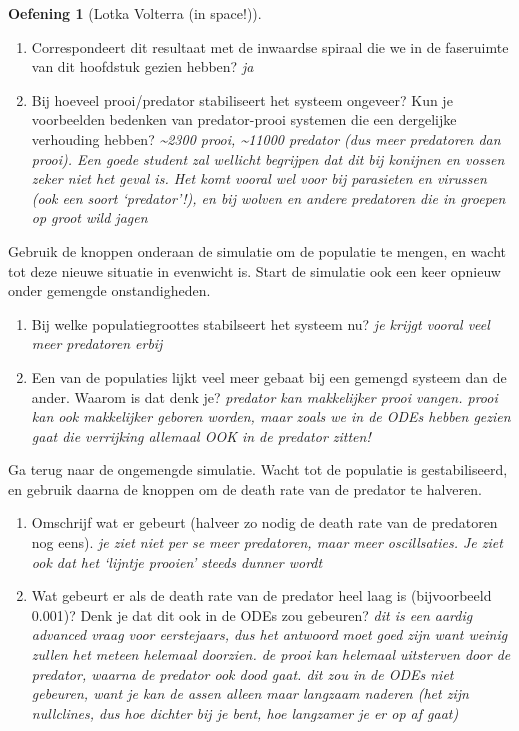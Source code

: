 \documentclass[
  a4paper,
]{scrbook}
\theoremstyle{definition}
\newtheorem{exercise}{Oefening}[chapter]
\theoremstyle{remark}
\begin{document}
\begin{exercise}[Lotka Volterra (in
space!)]
\begin{enumerate}
\def\labelenumi{\alph{enumi}.}
\setcounter{enumi}{1}
\item
  Correspondeert dit resultaat met de inwaardse spiraal die we in de
  faseruimte van dit hoofdstuk gezien hebben? \emph{ja}
\item
  Bij hoeveel prooi/predator stabiliseert het systeem ongeveer? Kun je
  voorbeelden bedenken van predator-prooi systemen die een dergelijke
  verhouding hebben? \emph{\textasciitilde2300 prooi,
  \textasciitilde11000 predator (dus meer predatoren dan prooi). Een
  goede student zal wellicht begrijpen dat dit bij konijnen en vossen
  zeker niet het geval is. Het komt vooral wel voor bij parasieten en
  virussen (ook een soort `predator'!), en bij wolven en andere
  predatoren die in groepen op groot wild jagen}
\end{enumerate}

Gebruik de knoppen onderaan de simulatie om de populatie te mengen, en
wacht tot deze nieuwe situatie in evenwicht is. Start de simulatie ook
een keer opnieuw onder gemengde onstandigheden.

\begin{enumerate}
\def\labelenumi{\alph{enumi}.}
\setcounter{enumi}{3}
\item
  Bij welke populatiegroottes stabilseert het systeem nu? \emph{je
  krijgt vooral veel meer predatoren erbij}
\item
  Een van de populaties lijkt veel meer gebaat bij een gemengd systeem
  dan de ander. Waarom is dat denk je? \emph{predator kan makkelijker
  prooi vangen. prooi kan ook makkelijker geboren worden, maar zoals we
  in de ODEs hebben gezien gaat die verrijking allemaal OOK in de
  predator zitten!}
\end{enumerate}

Ga terug naar de ongemengde simulatie. Wacht tot de populatie is
gestabiliseerd, en gebruik daarna de knoppen om de death rate van de
predator te halveren.

\begin{enumerate}
\def\labelenumi{\alph{enumi}.}
\setcounter{enumi}{5}
\item
  Omschrijf wat er gebeurt (halveer zo nodig de death rate van de
  predatoren nog eens). \emph{je ziet niet per se meer predatoren, maar
  meer oscillsaties. Je ziet ook dat het `lijntje prooien' steeds dunner
  wordt }
\item
  Wat gebeurt er als de death rate van de predator heel laag is
  (bijvoorbeeld 0.001)? Denk je dat dit ook in de ODEs zou gebeuren?
  \emph{dit is een aardig advanced vraag voor eerstejaars, dus het
  antwoord moet goed zijn want weinig zullen het meteen helemaal
  doorzien. de prooi kan helemaal uitsterven door de predator, waarna de
  predator ook dood gaat. dit zou in de ODEs niet gebeuren, want je kan
  de assen alleen maar langzaam naderen (het zijn nullclines, dus hoe
  dichter bij je bent, hoe langzamer je er op af gaat)}
\end{enumerate}

\end{exercise}
\end{document}
